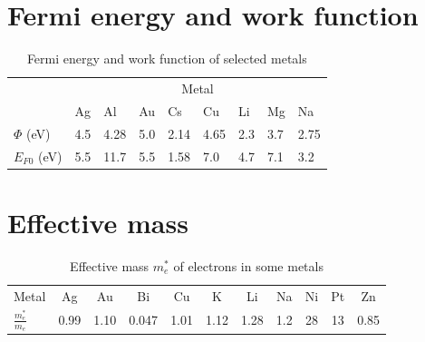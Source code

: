 \section{Fermi energy and work function}
\begin{table}[ht!]
    \centering
    \begin{tabular}{lllllllll}
    \toprule
        & \multicolumn{8}{c}{Metal}\\ \cmidrule{2-9}
        & Ag & Al & Au & Cs & Cu & Li & Mg & Na \\ \midrule
        $\varPhi$ (\si{\electronvolt}) & 4.5 & 4.28 & 5.0 & 2.14 & 4.65 & 2.3 & 3.7 & 2.75 \\
        $E_{F0}$ (\si{\electronvolt}) & 5.5 & 11.7 & 5.5 & 1.58 & 7.0 & 4.7 & 7.1 & 3.2 \\
    \bottomrule
    \end{tabular}
    \caption{Fermi energy and work function of selected metals}
    \label{app:fermienergy}
\end{table}

\section{Effective mass}
\begin{table}[htbp]
    \centering
    \begin{tabular}{lcccccccccc}
    \toprule
    Metal & Ag & Au & Bi & Cu & K & Li & Na & Ni & Pt & Zn \\
    $\frac{m_e^*}{m_e}$ & 0.99 & 1.10 & 0.047 & 1.01 & 1.12 & 1.28 & 1.2 & 28 & 13 & 0.85 \\
    \bottomrule
    \end{tabular}
    \caption{Effective mass $m_e^*$ of electrons in some metals}
    \label{app:effectivemass}
\end{table}

\newpage

